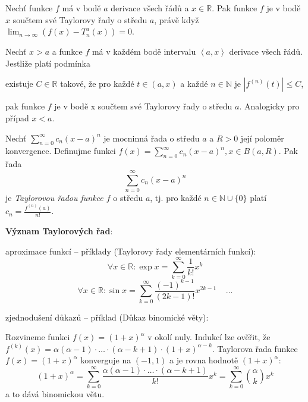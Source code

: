 \begin{poznamka}
Nechť funkce $f$ má v bodě $a$ derivace všech řádů a $x \in \mathbb{R}$. Pak funkce $f$ je v bodě $x$ součtem své Taylorovy řady o středu $a$, právě když $\lim_{n \rightarrow \infty} (f(x) - T_n^a(x))=0$.
\end{poznamka}

\begin{veta}
Nechť $x > a$ a funkce $f$ má v každém bodě intervalu $\left<a,x\right>$ derivace všech řádů. Jestliže platí podmínka
\begin{pitemize}
	\item existuje $C \in \mathbb{R}$ takové, že pro každé $t \in (a,x)$ a každé $n \in \mathbb{N}$ je $|f^{(n)}(t)| \le C$,
\end{pitemize}
pak funkce $f$ je v bodě x součtem své Taylorovy řady o středu $a$. Analogicky pro případ $x < a$.
\end{veta}

\begin{veta}
Nechť $\sum_{n=0}^{\infty} c_n(x-a)^n$ je mocninná řada o středu $a$ a $R>0$ její poloměr konvergence. Definujme funkci $f(x) = \sum_{n=0}^{\infty} c_n(x-a)^n, x \in B(a,R)$. Pak řada $$\sum_{n=0}^{\infty} c_n(x-a)^n$$ je \emph{Taylorovou řadou funkce $f$} o středu $a$, tj. pro každé $n \in \mathbb{N} \cup \{0\}$ platí $c_n = \frac{f^{(n)}(a)}{n!}$.
\end{veta}

\textbf{Význam Taylorových řad}:
\begin{pitemize}
\item aproximace funkcí -- příklady (Taylorovy řady elementárních funkcí):
	$$\forall x \in \mathbb{R}: \exp x=\sum_{k=0}^{\infty} \frac{1}{k!}x^k$$
	$$\forall x \in \mathbb{R}: \sin x=\sum_{k=0}^{\infty} \frac{(-1)^{k-1}}{(2k-1)!}x^{2k-1} \;\;\;\;\dots$$
\item zjednodušení důkazů -- příklad (Důkaz binomické věty): %
    \par\medskip
    Rozvineme funkci $f(x)=(1+x)^{\alpha}$ v okolí nuly. Indukcí lze ověřit, že 
    $f^{(k)}(x)=\alpha(\alpha-1)\cdot\dots\cdot(\alpha-k+1)\cdot(1+x)^{\alpha-k}$. 
    Taylorova řada funkce $f(x)=(1+x)^{\alpha}$ konverguje na $(-1,1)$ a je rovna hodnotě $(1+x)^{\alpha}$:
    $$(1+x)^{\alpha}=\sum_{k=0}^{\infty}\frac{\alpha(\alpha-1)\cdot\dots\cdot(\alpha-k+1)}{k!}x^k=\sum_{k=0}^{\infty}\binom{\alpha}{k}x^k$$
    a to dává binomickou větu.
\end{pitemize}


